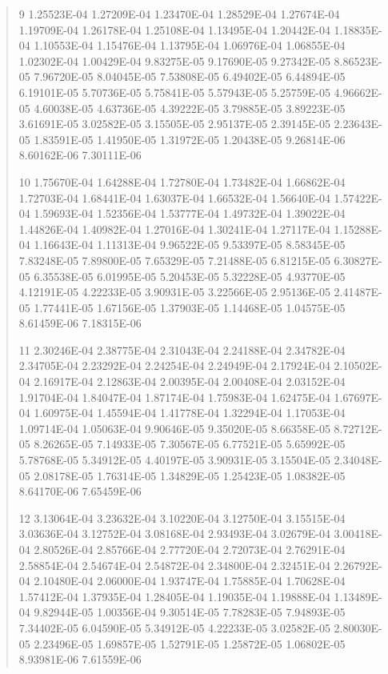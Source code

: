 \documentclass[letterpaper,10pt,english]{sphinxmanual}
\begin{document}
\begin{quote}
\begin{DUlineblock}{0em}
\begin{DUlineblock}{\DUlineblockindent}
\item[] 9   1.25523E-04  1.27209E-04  1.23470E-04  1.28529E-04  1.27674E-04  1.19709E-04  1.26178E-04  1.25108E-04  1.13495E-04  1.20442E-04  1.18835E-04  1.10553E-04  1.15476E-04  1.13795E-04  1.06976E-04  1.06855E-04  1.02302E-04  1.00429E-04  9.83275E-05  9.17690E-05  9.27342E-05  8.86523E-05  7.96720E-05  8.04045E-05  7.53808E-05  6.49402E-05  6.44894E-05  6.19101E-05  5.70736E-05  5.75841E-05  5.57943E-05  5.25759E-05  4.96662E-05  4.60038E-05  4.63736E-05  4.39222E-05  3.79885E-05  3.89223E-05  3.61691E-05  3.02582E-05  3.15505E-05  2.95137E-05  2.39145E-05  2.23643E-05  1.83591E-05  1.41950E-05  1.31972E-05  1.20438E-05  9.26814E-06  8.60162E-06  7.30111E-06
\end{DUlineblock}
\item[] 10   1.75670E-04  1.64288E-04  1.72780E-04  1.73482E-04  1.66862E-04  1.72703E-04  1.68441E-04  1.63037E-04  1.66532E-04  1.56640E-04  1.57422E-04  1.59693E-04  1.52356E-04  1.53777E-04  1.49732E-04  1.39022E-04  1.44826E-04  1.40982E-04  1.27016E-04  1.30241E-04  1.27117E-04  1.15288E-04  1.16643E-04  1.11313E-04  9.96522E-05  9.53397E-05  8.58345E-05  7.83248E-05  7.89800E-05  7.65329E-05  7.21488E-05  6.81215E-05  6.30827E-05  6.35538E-05  6.01995E-05  5.20453E-05  5.32228E-05  4.93770E-05  4.12191E-05  4.22233E-05  3.90931E-05  3.22566E-05  2.95136E-05  2.41487E-05  1.77441E-05  1.67156E-05  1.37903E-05  1.14468E-05  1.04575E-05  8.61459E-06  7.18315E-06
\item[] 11   2.30246E-04  2.38775E-04  2.31043E-04  2.24188E-04  2.34782E-04  2.34705E-04  2.23292E-04  2.24254E-04  2.24949E-04  2.17924E-04  2.10502E-04  2.16917E-04  2.12863E-04  2.00395E-04  2.00408E-04  2.03152E-04  1.91704E-04  1.84047E-04  1.87174E-04  1.75983E-04  1.62475E-04  1.67697E-04  1.60975E-04  1.45594E-04  1.41778E-04  1.32294E-04  1.17053E-04  1.09714E-04  1.05063E-04  9.90646E-05  9.35020E-05  8.66358E-05  8.72712E-05  8.26265E-05  7.14933E-05  7.30567E-05  6.77521E-05  5.65992E-05  5.78768E-05  5.34912E-05  4.40197E-05  3.90931E-05  3.15504E-05  2.34048E-05  2.08178E-05  1.76314E-05  1.34829E-05  1.25423E-05  1.08382E-05  8.64170E-06  7.65459E-06
\item[] 12   3.13064E-04  3.23632E-04  3.10220E-04  3.12750E-04  3.15515E-04  3.03636E-04  3.12752E-04  3.08168E-04  2.93493E-04  3.02679E-04  3.00418E-04  2.80526E-04  2.85766E-04  2.77720E-04  2.72073E-04  2.76291E-04  2.58854E-04  2.54674E-04  2.54872E-04  2.34800E-04  2.32451E-04  2.26792E-04  2.10480E-04  2.06000E-04  1.93747E-04  1.75885E-04  1.70628E-04  1.57412E-04  1.37935E-04  1.28405E-04  1.19035E-04  1.19888E-04  1.13489E-04  9.82944E-05  1.00356E-04  9.30514E-05  7.78283E-05  7.94893E-05  7.34402E-05  6.04590E-05  5.34912E-05  4.22233E-05  3.02582E-05  2.80030E-05  2.23496E-05  1.69857E-05  1.52791E-05  1.25872E-05  1.06802E-05  8.93981E-06  7.61559E-06

\end{DUlineblock}
\end{quote}
\end{document}
